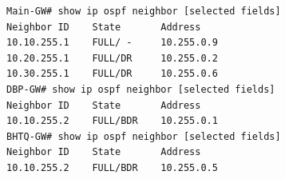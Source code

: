 \begin{Verbatim}[fontsize=\small,frame=single]
Main-GW# show ip ospf neighbor [selected fields]
Neighbor ID    State       Address
10.10.255.1    FULL/ -     10.255.0.9
10.20.255.1    FULL/DR     10.255.0.2
10.30.255.1    FULL/DR     10.255.0.6
DBP-GW# show ip ospf neighbor [selected fields]
Neighbor ID    State       Address
10.10.255.2    FULL/BDR    10.255.0.1
BHTQ-GW# show ip ospf neighbor [selected fields]
Neighbor ID    State       Address
10.10.255.2    FULL/BDR    10.255.0.5
\end{Verbatim}
